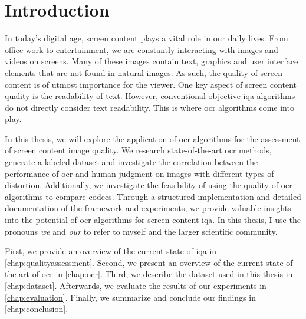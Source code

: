 \chapter{Introduction}
\label{chap:Introduction}


In today’s digital age, screen content plays a vital role in our daily lives.
From office work to entertainment, we are constantly interacting with images and videos on screens.
Many of these images contain text, graphics and user interface elements that are not found in natural images.
As such, the quality of screen content is of utmost importance for the viewer.
One key aspect of screen content quality is the readability of text.
However, conventional objective \gls{iqa} algorithms do not directly consider text readability.
This is where \gls{ocr} algorithms come into play.

In this thesis, we will explore the application of \gls{ocr} algorithms for the assessment of screen content image quality.
We research state-of-the-art \gls{ocr} methods, generate a labeled dataset and investigate the correlation between the performance of \gls{ocr} and human judgment on images with different types of distortion.
Additionally, we investigate the feasibility of using the quality of \gls{ocr} algorithms to compare codecs.
Through a structured implementation and detailed documentation of the framework and experiments, we provide valuable insights into the potential of \gls{ocr} algorithms for screen content \gls{iqa}.
In this thesis, I use the pronouns \textit{we} and \textit{our} to refer to myself and the larger scientific community.

First, we provide an overview of the current state of \gls{iqa} in \autoref{chap:qualityassessment}.
Second, we present an overview of the current state of the art of \gls{ocr} in \autoref{chap:ocr}.
Third, we describe the dataset used in this thesis in \autoref{chap:dataset}.
Afterwards, we evaluate the results of our experiments in \autoref{chap:evaluation}.
Finally, we summarize and conclude our findings in \autoref{chap:conclusion}.
